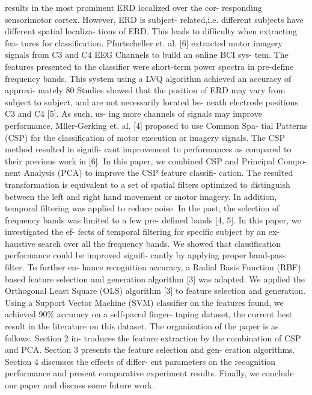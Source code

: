 \documentclass{article}
\begin{document}
results in the most prominent ERD localized over the cor- responding sensorimotor cortex. However, ERD is subject- related,i.e. different subjects have different spatial localiza- tions of ERD. This leads to difﬁculty when extracting fea- tures for classiﬁcation.
Pfurtscheller et. al. [6] extracted motor imagery signals from C3 and C4 EEG Channels to build an online BCI sys- tem. The features presented to the classiﬁer were short-term power spectra in pre-deﬁne frequency bands. This system using a LVQ algorithm achieved an accuracy of approxi- mately 80%
Studies  showed  that  the  position  of  ERD  may  vary from subject to subject, and are not necessarily located be- neath  electrode  positions  C3  and  C4  [5].  As  such,  us- ing more channels of signals may improve performance.
Mller-Gerking et. al. [4] proposed to use Common Spa-
tial Patterns (CSP) for the classiﬁcation of motor execution or imagery  signals. The CSP method resulted in  signiﬁ- cant improvement to performances  as compared to their previous work in  [6].
In this paper, we combined CSP and Principal Compo- nent Analysis (PCA) to improve the CSP feature classiﬁ- cation. The resulted transformation is equivalent to a set of spatial ﬁlters optimized to distinguish between the left and right hand movement or motor imagery. In addition, temporal ﬁltering was applied to reduce noise. In the past, the selection of frequency bands was limited to a few pre- deﬁned bands [4, 5]. In this paper, we investigated the ef- fects of temporal  ﬁltering for  speciﬁc  subject by  an ex- haustive search over all the frequency bands. We showed that classiﬁcation performance could be improved signiﬁ- cantly by applying proper band-pass ﬁlter. To further en- hance recognition accuracy, a Radial Basis Function (RBF) based feature selection and generation algorithm  [3] was adapted. We applied the Orthogonal Least Square (OLS) algorithm [3] to feature selection and generation. Using a Support Vector Machine (SVM) classiﬁer on the features found, we achieved 90\% accuracy on a self-paced ﬁnger- taping dataset, the current best result in the literature on this
dataset.
The organization of the paper is as follows. Section 2 in- troduces the feature extraction by the combination of CSP and PCA. Section 3 presents the feature selection and gen- eration algorithms. Section 4 discusses the effects of differ- ent parameters on the recognition performance and present comparative experiment results. Finally, we conclude our paper and discuss some future work.
\end{document}
